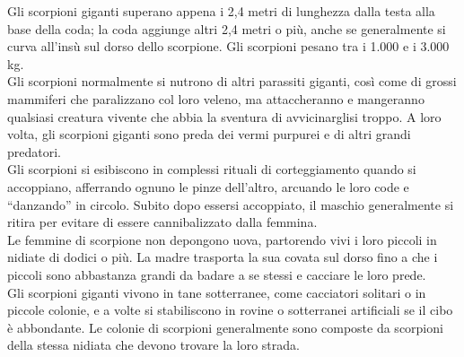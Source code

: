 \begin{multicols}{2}
Gli scorpioni giganti superano appena i 2,4 metri di lunghezza dalla testa alla base della coda; la coda aggiunge altri 2,4 metri o più, anche se generalmente si curva all'insù sul dorso dello scorpione. Gli scorpioni pesano tra i 1.000 e i 3.000 kg.\\

Gli scorpioni normalmente si nutrono di altri parassiti giganti, così come di grossi mammiferi che paralizzano col loro veleno, ma attaccheranno e mangeranno qualsiasi creatura vivente che abbia la sventura di avvicinarglisi troppo. A loro volta, gli scorpioni giganti sono preda dei vermi purpurei e di altri grandi predatori.\\

Gli scorpioni si esibiscono in complessi rituali di corteggiamento quando si accoppiano, afferrando ognuno le pinze dell’altro, arcuando le loro code e “danzando” in circolo. Subito dopo essersi accoppiato, il maschio generalmente si ritira per evitare di essere cannibalizzato dalla femmina.\\

Le femmine di scorpione non depongono uova, partorendo vivi i loro piccoli in nidiate di dodici o più. La madre trasporta la sua covata sul dorso fino a che i piccoli sono abbastanza grandi da badare a se stessi e cacciare le loro prede.\\

Gli scorpioni giganti vivono in tane sotterranee, come cacciatori solitari o in piccole colonie, e a volte si stabiliscono in rovine o sotterranei artificiali se il cibo è abbondante. Le colonie di scorpioni generalmente sono composte da scorpioni della stessa nidiata che devono trovare la loro strada.\\


\end{multicols}
